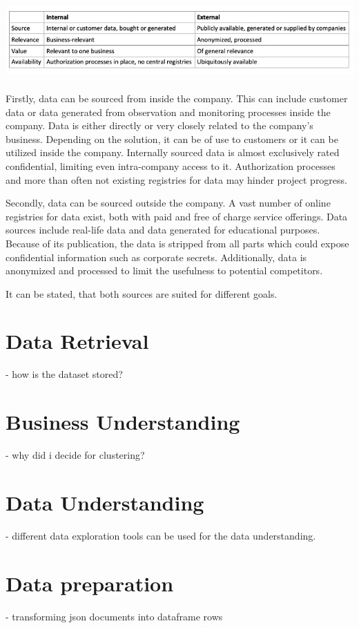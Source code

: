 	\includegraphics[height=3cm]{Bilder/internal_external.png}
	
	Firstly, data can be sourced from inside the company. This can include customer data or data generated from observation and monitoring processes inside the company. Data is either directly or very closely related to the company's business. Depending on the solution, it can be of use to customers or it can be utilized inside the company. Internally sourced data is almost exclusively rated confidential, limiting even intra-company access to it. Authorization processes and more than often not existing registries for data may hinder project progress.
	
	Secondly, data can be sourced outside the company. A vast number of online registries for data exist, both with paid and free of charge service offerings. Data sources include real-life data and data generated for educational purposes. Because of its publication, the data is stripped from all parts which could expose confidential information such as corporate secrets. Additionally, data is anonymized and processed to limit the usefulness to potential competitors.
	
	It can be stated, that both sources are suited for different goals. 
		
\section{Data Retrieval}
	- how is the dataset stored?

\section{Business Understanding}

	- why did i decide for clustering?

\section{Data Understanding}
	- different data exploration tools can be used for the data understanding.

\section{Data preparation}
- transforming json documents into dataframe rows

